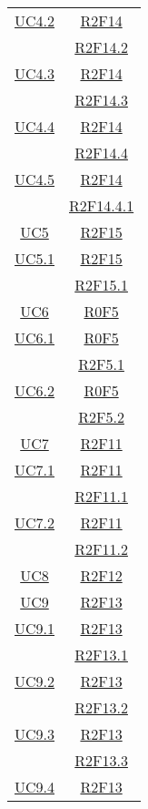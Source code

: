 \begin{longtable}{|c|c|}
\hline
\hyperlink{UC4.2}{UC4.2} & \hyperlink{R2F14}{R2F14}\\
& \hyperlink{R2F14.2}{R2F14.2}\\
\hline
\hyperlink{UC4.3}{UC4.3} & \hyperlink{R2F14}{R2F14}\\
& \hyperlink{R2F14.3}{R2F14.3}\\
\hline
\hyperlink{UC4.4}{UC4.4} & \hyperlink{R2F14}{R2F14}\\
& \hyperlink{R2F14.4}{R2F14.4}\\
\hline
\hyperlink{UC4.5}{UC4.5} & \hyperlink{R2F14}{R2F14}\\
& \hyperlink{R2F14.4.1}{R2F14.4.1}\\
\hline
\hyperlink{UC5}{UC5} & \hyperlink{R2F15}{R2F15}\\
\hline
\hyperlink{UC5.1}{UC5.1} & \hyperlink{R2F15}{R2F15}\\
& \hyperlink{R2F15.1}{R2F15.1}\\
\hline
\hyperlink{UC6}{UC6} & \hyperlink{R0F5}{R0F5}\\
\hline
\hyperlink{UC6.1}{UC6.1} & \hyperlink{R0F5}{R0F5}\\
& \hyperlink{R2F5.1}{R2F5.1}\\
\hline
\hyperlink{UC6.2}{UC6.2} & \hyperlink{R0F5}{R0F5}\\
& \hyperlink{R2F5.2}{R2F5.2}\\
\hline
\hyperlink{UC7}{UC7} & \hyperlink{R2F11}{R2F11}\\
\hline
\hyperlink{UC7.1}{UC7.1} & \hyperlink{R2F11}{R2F11}\\
& \hyperlink{R2F11.1}{R2F11.1}\\
\hline
\hyperlink{UC7.2}{UC7.2} & \hyperlink{R2F11}{R2F11}\\
& \hyperlink{R2F11.2}{R2F11.2}\\
\hline
\hyperlink{UC8}{UC8} & \hyperlink{R2F12}{R2F12}\\
\hline
\hyperlink{UC9}{UC9} & \hyperlink{R2F13}{R2F13}\\
\hline
\hyperlink{UC9.1}{UC9.1} & \hyperlink{R2F13}{R2F13}\\
& \hyperlink{R2F13.1}{R2F13.1}\\
\hline
\hyperlink{UC9.2}{UC9.2} & \hyperlink{R2F13}{R2F13}\\
& \hyperlink{R2F13.2}{R2F13.2}\\
\hline
\hyperlink{UC9.3}{UC9.3} & \hyperlink{R2F13}{R2F13}\\
& \hyperlink{R2F13.3}{R2F13.3}\\
\hline
\hyperlink{UC9.4}{UC9.4} & \hyperlink{R2F13}{R2F13}\\

\end{longtable}
